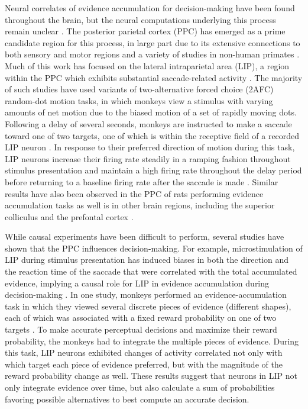 Neural correlates of evidence accumulation for decision-making have been found throughout the brain, but the neural computations underlying this process remain unclear \citep{Shadlen:1996ga, Gold:2000hp, Yang:2007in, Hanks:2015fy, Britten:1992wx, Mante:2013ie, Horwitz:1999ws, Gold:2007fo, Roitman:2002wr}. The posterior parietal cortex (PPC) has emerged as a prime candidate region for this process, in large part due to its extensive connections to both sensory and motor regions \citep{Blatt:1990in} and a variety of studies in non-human primates \citep{Bisley:2010ci, Gold:2007fo, Andersen:2009tm}. Much of this work has focused on the lateral intraparietal area (LIP), a region within the PPC which exhibits substantial saccade-related activity \citep{Bisley:2010ci, Gold:2007fo}. The majority of such studies have used variants of two-alternative forced choice (2AFC) random-dot motion tasks, in which monkeys view a stimulus with varying amounts of net motion due to the biased motion of a set of rapidly moving dots. Following a delay of several seconds, monkeys are instructed to make a saccade toward one of two targets, one of which is within the receptive field of a recorded LIP neuron \citep{Shadlen:1998ta, Shadlen:1996ga}. In response to their preferred direction of motion during this task, LIP neurons increase their firing rate steadily in a ramping fashion throughout stimulus presentation and maintain a high firing rate throughout the delay period before returning to a baseline firing rate after the saccade is made \citep{Shadlen:1996ga}. Similar results have also been observed in the PPC of rats performing evidence accumulation tasks \citep{Hanks:2015fy} as well is in other brain regions, including the superior colliculus and the prefontal cortex \citep{Mante:2013ie, Horwitz:1999ws}. 

\bigskip
While causal experiments have been difficult to perform, several studies have shown that the PPC influences decision-making. For example, microstimulation of LIP during stimulus presentation has induced biases in both the direction and the reaction time of the saccade that were correlated with the total accumulated evidence, implying a causal role for LIP in evidence accumulation during decision-making \citep{Gold:2000hp, Hanks:2006jt}. In one study, monkeys performed an evidence-accumulation task in which they viewed several discrete pieces of evidence (different shapes), each of which was associated with a fixed reward probability on one of two targets \citep{Yang:2007in}. To make accurate perceptual decisions and maximize their reward probability, the monkeys had to integrate the multiple pieces of evidence. During this task, LIP neurons exhibited changes of activity correlated not only with which target each piece of evidence preferred, but with the magnitude of the reward probability change as well. These results suggest that neurons in LIP not only integrate evidence over time, but also calculate a sum of probabilities favoring possible alternatives to best compute an accurate decision.

